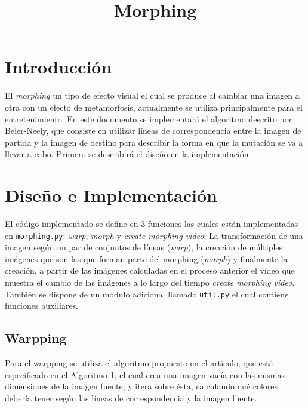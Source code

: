 \documentclass[conference]{IEEEtran}
\begin{document}
\title{Morphing}
\author{
}


\maketitle

\begin{abstract}
	
\end{abstract}
 

\section*{Introducción} %
	El \textit{morphing} un tipo de efecto visual el cual se produce al cambiar una imagen a otra con un efecto de metamorfosis, actualmente se utiliza principalmente para el entretenimiento. En este documento se implementará el algoritmo descrito por Beier-Neely\cite{Paper}, que consiste en utilizar líneas de correspondencia entre la imagen de partida y la imagen de destino para describir la forma en que la mutación se va a llevar a cabo. Primero se describirá el diseño en la implementación
	
	
\section*{Diseño e Implementación}
	El código implementado se define en 3 funciones las cuales están implementadas en \texttt{morphing.py}: \textit{warp}, \textit{morph} y \textit{create morphing video}: La transformación de una imagen según un par de conjuntos de líneas (\textit{warp}), la creación de múltiples imágenes que son las que forman parte del morphing (\textit{morph}) y finalmente la creación, a partir de las imágenes calculadas en el proceso anterior el vídeo que muestra el cambio de las imágenes a lo largo del tiempo \textit{create morphing video}. También se dispone de un módulo adicional llamado \texttt{util.py} el cual contiene funciones auxiliares.
	
	\subsection*{Warpping}
		Para el warpping se utiliza el algoritmo propuesto en el artículo\cite{Paper}, que está especificado en el Algoritmo 1, el cual crea una imagen vacía con las mismas dimensiones de la imagen fuente, y itera sobre ésta, calculando qué colores debería tener según las líneas de correspondencia y la imagen fuente.
\end{document}
